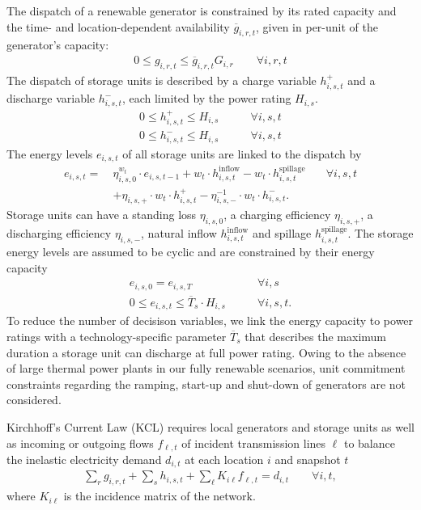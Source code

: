 The dispatch of a renewable generator is constrained by its rated capacity and
the time- and location-dependent availability $\overline{g}_{i,r,t}$, given in
per-unit of the generator's capacity:
\begin{align}
    0 \leq g_{i,r,t} \leq \overline{g}_{i,r,t} G_{i,r} \qquad\forall i, r, t
\end{align}
The dispatch of storage units is described by a charge variable $h_{i,s,t}^+$
and a discharge variable $h_{i,s,t}^-$, each limited by the power rating
$H_{i,s}$.
\begin{align}
    0 \leq h_{i,s,t}^+ \leq H_{i,s} &\qquad\forall i, s, t \\
    0 \leq h_{i,s,t}^- \leq H_{i,s} &\qquad\forall i, s, t
\end{align}
The energy levels $e_{i,s,t}$ of all storage units are linked to the dispatch by
\begin{align}
    e_{i,s,t} =\: & \eta_{i,s,0}^{w_t} \cdot e_{i,s,t-1} + w_t \cdot h_{i,s,t}^\text{inflow} - w_t \cdot h_{i,s,t}^\text{spillage} & \quad\forall i, s, t \nonumber \\
    & + \eta_{i,s,+} \cdot w_t \cdot h_{i,s,t}^+ - \eta_{i,s,-}^{-1} \cdot w_t \cdot h_{i,s,t}^-.
\end{align}
Storage units can have a standing loss $\eta_{i,s,0}$, a charging efficiency
$\eta_{i,s,+}$, a discharging efficiency $\eta_{i,s,-}$, natural inflow
$h_{i,s,t}^\text{inflow}$ and spillage $h_{i,s,t}^\text{spillage}$. The storage
energy levels are assumed to be cyclic and are constrained by their energy
capacity
\begin{align}
    e_{i,s,0} = e_{i,s,T} &\qquad\forall i, s \\
    0 \leq e_{i,s,t} \leq \overline{T}_s \cdot H_{i,s} &\qquad\forall i, s, t.
\end{align}
To reduce the number of decisison variables, we link the energy capacity to
power ratings with a technology-specific parameter $\overline{T}_s$ that
describes the maximum duration a storage unit can discharge at full power
rating. Owing to the absence of large thermal power plants in our fully
renewable scenarios, unit commitment constraints regarding the ramping, start-up
and shut-down of generators are not considered.

Kirchhoff's Current Law (KCL) requires local generators and storage units as
well as incoming or outgoing flows $f_{\ell,t}$ of incident transmission lines
$\ell$ to balance the inelastic electricity demand $d_{i,t}$ at each location
$i$ and snapshot $t$
\begin{align}
    \sum_r g_{i,r,t} + \sum_s h_{i,s,t} + \sum_\ell K_{i\ell} f_{\ell,t} = d_{i,t} \qquad\forall i,t,
\end{align}
where $K_{i\ell}$ is the incidence matrix of the network.

